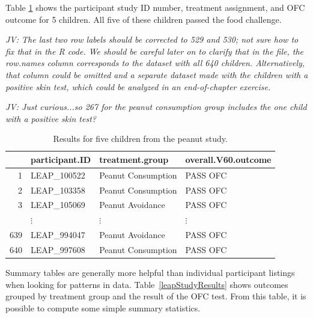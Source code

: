 \begin{doublespace}
Table \ref{leapStudyResultsDF} shows the participant study ID number, treatment assignment, and OFC outcome for 5 children. All five of these children passed the food challenge. 
 
\textit{JV: The last two row labels should be corrected to 529 and 530; not sure how to fix that in the R code. We should be careful later on to clarify that in the file, the row.names column corresponds to the dataset with all 640 children. Alternatively, that column could be omitted and a separate dataset made with the children with a positive skin test, which could be analyzed in an end-of-chapter exercise.}

\textit{JV: Just curious...so 267 for the peanut consumption group includes the one child with a positive skin test?}

\begin{table}[ht]
\centering
\begin{tabular}{rlll}
  \hline
 & participant.ID & treatment.group & overall.V60.outcome \\ 
  \hline
1 & LEAP\_100522 & Peanut Consumption & PASS OFC \\ 
  2 & LEAP\_103358 & Peanut Consumption & PASS OFC \\ 
  3 & LEAP\_105069 & Peanut Avoidance & PASS OFC \\ 
& $\vdots$	&	$\vdots$	  &	$\vdots$  \\
  639 & LEAP\_994047 & Peanut Avoidance & PASS OFC \\ 
  640 & LEAP\_997608 & Peanut Consumption & PASS OFC \\ 
   \hline
\end{tabular}
\caption{Results for five children from the peanut study.}
\label{leapStudyResultsDF}
\end{table}


Summary tables are generally more helpful than individual participant listings  when looking for patterns in data. Table~\ref{leapStudyResults} shows outcomes grouped by treatment group and the result of the OFC test. From this table, it is possible to compute some simple summary statistics. 


\end{doublespace}

